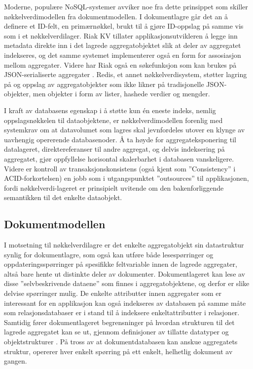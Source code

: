 Moderne, populære NoSQL-systemer avviker noe fra dette prinsippet som skiller nøkkel\-verdi\-modellen fra dokumentmodellen. I dokumentlagre går det an å definere et ID-felt, en primærnøkkel, brukt til å gjøre ID-oppslag på samme vis som i et nøkkelverdilager. Riak KV tillater applikasjonsutvikleren å legge inn metadata direkte inn i det lagrede aggregatobjektet slik at deler av aggregatet indekseres, og det samme systemet implementerer også en form for assosiasjon mellom aggregater. Videre har Riak også en søkefunksjon som kan brukes på JSON-serialiserte aggregater \citep{sadalage2013}. Redis, et annet nøkkelverdisystem, støtter lagring på og oppslag av aggregatobjekter som ikke likner på tradisjonelle JSON-objekter, men objekter i form av lister, hashede verdier og mengder.

I kraft av databasens egenskap i å støtte kun én eneste indeks, nemlig oppslagsnøkkelen til dataobjektene, er nøkkel\-verdi\-modellen forenlig med systemkrav om at datavolumet som lagres skal jevnfordeles utover en klynge av uavhengig opererende databasenoder. Å ta høyde for aggregateksponering til datalageret, direktereferanser til andre aggregat, og delvis indeksering på aggregatet, gjør oppfyllelse horisontal skalerbarhet i databasen vanskeligere. Videre er kontroll av transaksjonskonsistens (også kjent som ''Consistency'' i ACID-forkortelsen) en jobb som i utgangspunktet ''outsources'' til applikasjonen, fordi nøkkelverdi-lageret er prinsipielt uvitende om den bakenforliggende semantikken til det enkelte dataobjekt.

\subsection{Dokumentmodellen}

I motsetning til nøkkelverdilagre er det enkelte aggregatobjekt sin datastruktur synlig for dokumentlagre, som også kan utføre både lesespørringer og oppdateringsspørringer på spesifikke feltvariable innen de lagrede aggregater, altså bare hente ut distinkte deler av dokumenter. Dokumentlageret kan lese av disse ''selvbeskrivende dataene'' \citep{sadalage2013, elmasri2014} som finnes i aggregatobjektene, og derfor er slike delvise spørringer mulig. De enkelte attributter innen aggregater som er interessant for en applikasjon kan også indekseres av databasen på samme måte som relasjonsdatabaser er i stand til å indeksere enkeltattributter i relasjoner. Samtidig fører dokumentlageret begrensninger på hvordan strukturen til det lagrede aggregatet kan se ut, gjennom definisjoner av tillatte datatyper og objektstrukturer \citep{sadalage2013}. På tross av at dokumentdatabasen kan anskue aggregatets struktur, opererer hver enkelt spørring på ett enkelt, helhetlig dokument av gangen.

